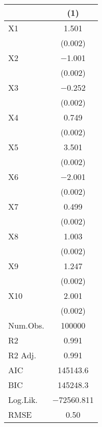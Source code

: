 \begin{table}
\centering
\begin{tabular}[t]{lc}
\toprule
  & (1)\\
\midrule
X1 & \num{1.501}\\
 & \vphantom{9} (\num{0.002})\\
X2 & \num{-1.001}\\
 & \vphantom{8} (\num{0.002})\\
X3 & \num{-0.252}\\
 & \vphantom{7} (\num{0.002})\\
X4 & \num{0.749}\\
 & \vphantom{6} (\num{0.002})\\
X5 & \num{3.501}\\
 & \vphantom{5} (\num{0.002})\\
X6 & \num{-2.001}\\
 & \vphantom{4} (\num{0.002})\\
X7 & \num{0.499}\\
 & \vphantom{3} (\num{0.002})\\
X8 & \num{1.003}\\
 & \vphantom{2} (\num{0.002})\\
X9 & \num{1.247}\\
 & \vphantom{1} (\num{0.002})\\
X10 & \num{2.001}\\
 & (\num{0.002})\\
\midrule
Num.Obs. & \num{100000}\\
R2 & \num{0.991}\\
R2 Adj. & \num{0.991}\\
AIC & \num{145143.6}\\
BIC & \num{145248.3}\\
Log.Lik. & \num{-72560.811}\\
RMSE & \num{0.50}\\
\bottomrule
\end{tabular}
\end{table}
